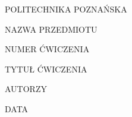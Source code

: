 \begin{titlepage}
    \begin{center}
        \fontsize{24pt}{24pt}\selectfont
            POLITECHNIKA POZNAŃSKA

        \vspace*{12mm}

        \fontsize{22pt}{22pt}\selectfont
            NAZWA PRZEDMIOTU

        \vspace*{15mm}

        \fontsize{18pt}{18pt}\selectfont
            NUMER ĆWICZENIA

        \vspace*{5mm}

        \fontsize{18pt}{18pt}\selectfont
            TYTUŁ ĆWICZENIA

        \vspace*{15mm}

        \fontsize{14pt}{14pt}\selectfont

            AUTORZY

        \fontsize{16pt}{16pt}\selectfont
            \vfill
            DATA
            
    \end{center}
\end{titlepage}
\tableofcontents
\newpage
